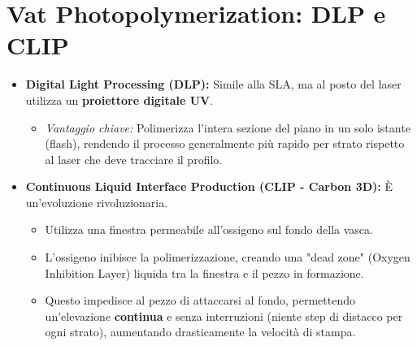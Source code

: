 \section{Vat Photopolymerization: DLP e CLIP}
\begin{itemize}
    \item \textbf{Digital Light Processing (DLP):} Simile alla SLA, ma al posto del laser utilizza un \textbf{proiettore digitale UV}.
          \begin{itemize}
              \item \textit{Vantaggio chiave:} Polimerizza l'intera sezione del piano in un solo istante (flash), rendendo il processo generalmente più rapido per strato rispetto al laser che deve tracciare il profilo.
          \end{itemize}
    \item \textbf{Continuous Liquid Interface Production (CLIP - Carbon 3D):} È un'evoluzione rivoluzionaria.
          \begin{itemize}
              \item Utilizza una finestra permeabile all'ossigeno sul fondo della vasca.
              \item L'ossigeno inibisce la polimerizzazione, creando una "dead zone" (Oxygen Inhibition Layer) liquida tra la finestra e il pezzo in formazione.
              \item Questo impedisce al pezzo di attaccarsi al fondo, permettendo un'elevazione \textbf{continua} e senza interruzioni (niente step di distacco per ogni strato), aumentando drasticamente la velocità di stampa.
          \end{itemize}
\end{itemize}

